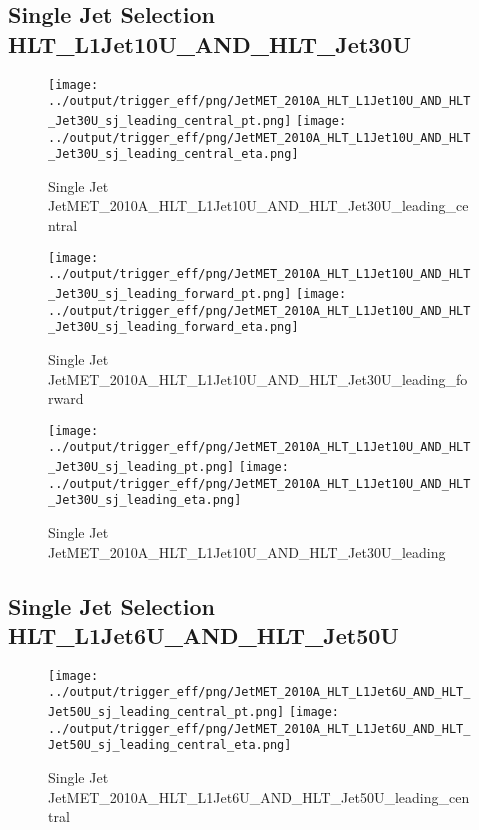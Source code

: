 \documentclass[11pt]{article}
\begin{document}
\newpage
\subsection{Single Jet Selection HLT\_L1Jet10U\_AND\_HLT\_Jet30U}
\begin{figure}[ht]
\centering
\texttt{[image: ../output/trigger\_eff/png/JetMET\_2010A\_HLT\_L1Jet10U\_AND\_HLT\_Jet30U\_sj\_leading\_central\_pt.png]}
\texttt{[image: ../output/trigger\_eff/png/JetMET\_2010A\_HLT\_L1Jet10U\_AND\_HLT\_Jet30U\_sj\_leading\_central\_eta.png]}
\caption{Single Jet JetMET\_2010A\_HLT\_L1Jet10U\_AND\_HLT\_Jet30U\_leading\_central}
\label{fig:jetmet_sj_L1Jet10U_AND_HLT_Jet30U_leading_central}
\end{figure}

\begin{figure}[ht]
\centering
\texttt{[image: ../output/trigger\_eff/png/JetMET\_2010A\_HLT\_L1Jet10U\_AND\_HLT\_Jet30U\_sj\_leading\_forward\_pt.png]}
\texttt{[image: ../output/trigger\_eff/png/JetMET\_2010A\_HLT\_L1Jet10U\_AND\_HLT\_Jet30U\_sj\_leading\_forward\_eta.png]}
\caption{Single Jet JetMET\_2010A\_HLT\_L1Jet10U\_AND\_HLT\_Jet30U\_leading\_forward}
\label{fig:jetmet_sj_L1Jet10U_AND_HLT_Jet30U_leading_forward}
\end{figure}

\begin{figure}[ht]
\centering
\texttt{[image: ../output/trigger\_eff/png/JetMET\_2010A\_HLT\_L1Jet10U\_AND\_HLT\_Jet30U\_sj\_leading\_pt.png]}
\texttt{[image: ../output/trigger\_eff/png/JetMET\_2010A\_HLT\_L1Jet10U\_AND\_HLT\_Jet30U\_sj\_leading\_eta.png]}
\caption{Single Jet JetMET\_2010A\_HLT\_L1Jet10U\_AND\_HLT\_Jet30U\_leading}
\label{fig:jetmet_sj_L1Jet10U_AND_HLT_Jet30U_leading}
\end{figure}


\newpage
\subsection{Single Jet Selection HLT\_L1Jet6U\_AND\_HLT\_Jet50U}
\begin{figure}[ht]
\centering
\texttt{[image: ../output/trigger\_eff/png/JetMET\_2010A\_HLT\_L1Jet6U\_AND\_HLT\_Jet50U\_sj\_leading\_central\_pt.png]}
\texttt{[image: ../output/trigger\_eff/png/JetMET\_2010A\_HLT\_L1Jet6U\_AND\_HLT\_Jet50U\_sj\_leading\_central\_eta.png]}
\caption{Single Jet JetMET\_2010A\_HLT\_L1Jet6U\_AND\_HLT\_Jet50U\_leading\_central}
\label{fig:jetmet_sj_L1Jet6U_AND_HLT_Jet50U_leading_central}
\end{figure}
\end{document}
